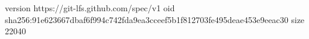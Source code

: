 version https://git-lfs.github.com/spec/v1
oid sha256:91e623667dbaf6f994c742fda9ea3cceef5b1f812703fe495deae453e9eeac30
size 22040
